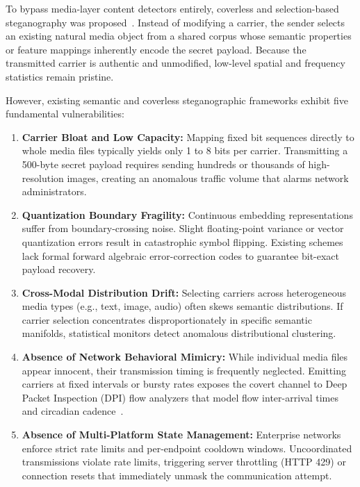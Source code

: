 \documentclass[11pt,journal,onecolumn]{IEEEtran}\linespread{1.3}
\begin{document}
To bypass media-layer content detectors entirely, coverless and selection-based steganography was proposed~\cite{zhou2015novel,zhang2018coverless}. Instead of modifying a carrier, the sender selects an existing natural media object from a shared corpus whose semantic properties or feature mappings inherently encode the secret payload. Because the transmitted carrier is authentic and unmodified, low-level spatial and frequency statistics remain pristine.

However, existing semantic and coverless steganographic frameworks exhibit five fundamental vulnerabilities:
\begin{enumerate}
    \item \textbf{Carrier Bloat and Low Capacity:} Mapping fixed bit sequences directly to whole media files typically yields only 1 to 8 bits per carrier. Transmitting a 500-byte secret payload requires sending hundreds or thousands of high-resolution images, creating an anomalous traffic volume that alarms network administrators.
    \item \textbf{Quantization Boundary Fragility:} Continuous embedding representations suffer from boundary-crossing noise. Slight floating-point variance or vector quantization errors result in catastrophic symbol flipping. Existing schemes lack formal forward algebraic error-correction codes to guarantee bit-exact payload recovery.
    \item \textbf{Cross-Modal Distribution Drift:} Selecting carriers across heterogeneous media types (e.g., text, image, audio) often skews semantic distributions. If carrier selection concentrates disproportionately in specific semantic manifolds, statistical monitors detect anomalous distributional clustering.
    \item \textbf{Absence of Network Behavioral Mimicry:} While individual media files appear innocent, their transmission timing is frequently neglected. Emitting carriers at fixed intervals or bursty rates exposes the covert channel to Deep Packet Inspection (DPI) flow analyzers that model flow inter-arrival times and circadian cadence~\cite{wright2006inferring,dyer2012peekaboo}.
    \item \textbf{Absence of Multi-Platform State Management:} Enterprise networks enforce strict rate limits and per-endpoint cooldown windows. Uncoordinated transmissions violate rate limits, triggering server throttling (HTTP 429) or connection resets that immediately unmask the communication attempt.
\end{enumerate}
\end{document}
